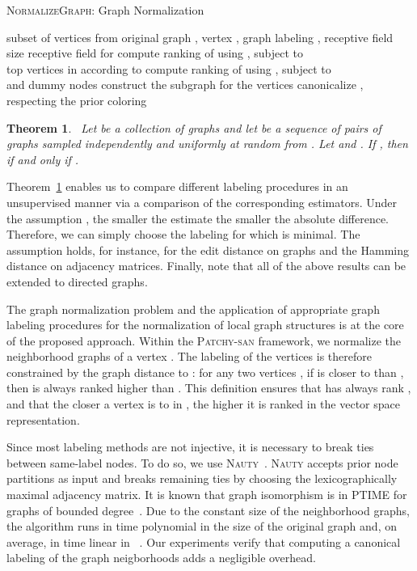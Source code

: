 \documentclass{article}
\newtheorem{thmx}{Theorem}
\newcommand{\patchysan}{{\textsc{Patchy-san}}\xspace}
\newcommand{\nauty}{{\textsc{Nauty}}\xspace}
\begin{document}
\begin{algorithm}[t!]
   \small
   \caption{\textsc{NormalizeGraph}: Graph Normalization}
   \label{alg:normalization}
\begin{algorithmic}[1]
    subset of vertices  from original graph , vertex , graph labeling , receptive field size 
     receptive field for 
\STATE compute ranking  of  using , subject to \\  
   \IF{}
   \STATE  top  vertices in  according to 
   \STATE compute ranking  of  using , subject to \\  
   \ELSIF{}
   \STATE  and  dummy nodes
   \ELSE 
   \STATE 
   \ENDIF
   \STATE construct the subgraph  for the vertices 
   \STATE canonicalize , respecting the prior coloring 
\end{algorithmic}
\end{algorithm}




\begin{thmx}~\label{thrm:graph_norm_expectation}
Let  be a collection of graphs and let  be a sequence of pairs of graphs sampled independently and uniformly at random from . Let 
 and . If , then  if and only if .
\end{thmx}

Theorem~\ref{thrm:graph_norm_expectation} enables us to compare different labeling procedures in an unsupervised manner via a comparison of the corresponding estimators.  Under the assumption , the smaller the estimate  the smaller the absolute difference. Therefore, we can simply choose the labeling  for which  is minimal. The assumption  holds, for instance, for the edit distance on graphs and the Hamming distance on adjacency matrices. Finally, note that all of the above results can be extended to directed graphs. 

The graph normalization problem and the application of appropriate graph labeling procedures for the normalization of local graph structures is at the core of the proposed approach. Within the \patchysan framework, we normalize the neighborhood graphs of a vertex . The labeling of the vertices is therefore constrained by the graph distance to  : for any two vertices , if  is closer to  than , then  is always ranked higher than . 
This definition ensures that  has always rank , and that the closer a vertex is to  in , the higher it is ranked in the vector space representation.

Since most labeling methods are not injective, it is necessary to break ties between same-label nodes. To do so, we use \nauty~\cite{McKay:2014}. \nauty accepts prior node partitions as input and breaks remaining ties by choosing the lexicographically maximal adjacency matrix. It is known that graph isomorphism is in PTIME for graphs of bounded degree~\cite{luks:1982}. Due to the constant size  of the neighborhood graphs, the algorithm runs in time polynomial in the size of the original graph and, on average, in time linear in ~\cite{Babai:1980}. Our experiments verify that computing a canonical labeling of the graph neigborhoods adds a negligible overhead.
\end{document}
